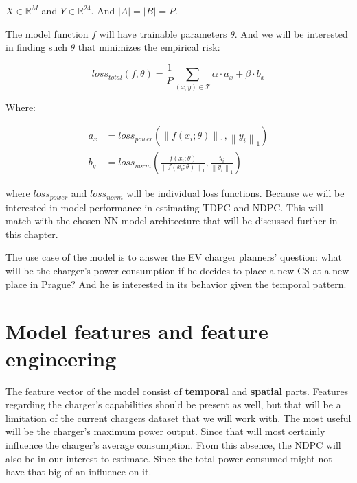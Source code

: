 $X \in \mathbb{R}^M$ and $Y\in \mathbb{R}^{24}$. And $| A | = | B | = P$.

The model function $f$ will have trainable parameters $\theta$. And we will be interested in finding such $\theta$ that minimizes the empirical risk:

\begin{equation}
    \mathit{loss_{total}}(f,\theta) = \frac{1}{P} \sum_{(x,y)\in\mathcal{T}} \alpha \cdot a_x + \beta \cdot b_x
\end{equation}

Where:

\begin{equation}
    \begin{split}
        a_x & = \mathit{loss_{power}}
        (\left \lVert f(x_i;\theta) \right \rVert_{1}, \left \lVert y_i \right \rVert_{1}) \\
        b_y & = \mathit{loss_{norm}}
        (\frac{f(x_i;\theta)}{\left \lVert f(x_i;\theta) \right \rVert_{1}}, \frac{y_i}{\left \lVert y_i \right \rVert_{1}})
    \end{split}
\end{equation}


where $\mathit{loss_{power}}$ and $\mathit{loss_{norm}}$ will be individual loss functions. Because we will be interested in model performance in estimating \acrfull{TDPC} and \acrfull{NDPC}. This will match with the chosen NN model architecture that will be discussed further in this chapter.

The use case of the model is to answer the EV charger planners' question: what will be the charger's power consumption if he decides to place a new \acrfull{CS} at a new place in Prague? And he is interested in its behavior given the temporal pattern.

\section{Model features and feature engineering}

The feature vector of the model consist of \textbf{temporal} and \textbf{spatial} parts. Features regarding the charger's capabilities should be present as well, but that will be a limitation of the current chargers dataset that we will work with. The most useful will be the charger's maximum power output. Since that will most certainly influence the charger's average consumption. From this absence, the \acrfull{NDPC} will also be in our interest to estimate. Since the total power consumed might not have that big of an influence on it.

